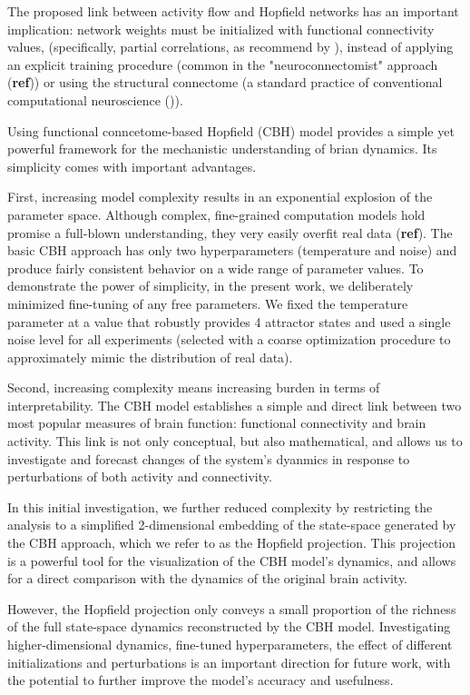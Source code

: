 \documentclass{article}
\begin{document}
The proposed link between activity flow and Hopfield networks has an important implication: network weights must be initialized with functional connectivity values, (specifically, partial correlations, as recommend by \href{https://doi.org/10.1038/nn.4406}{}), instead of applying an explicit training procedure (common in the "neuroconnectomist" approach (\textbf{ref})) or using the structural connectome (a standard practice of conventional computational neuroscience (\href{https://doi.org/10.1016/j.neuroimage.2017.03.045}{})).

Using functional conncetome-based Hopfield (CBH) model provides a simple yet powerful framework for the mechanistic understanding of brian dynamics. Its simplicity comes with important advantages.

First, increasing model complexity results in an exponential explosion of the parameter space. Although complex, fine-grained computation models hold promise a full-blown understanding, they very easily overfit real data (\textbf{ref}). The basic CBH approach has only two hyperparameters (temperature and noise) and produce fairly consistent behavior on a wide range of parameter values. To demonstrate the power of simplicity, in the present work, we deliberately minimized fine-tuning of any free parameters. We fixed the temperature parameter at a value that robustly provides 4 attractor states and used a single noise level for all experiments (selected with a coarse optimization procedure to approximately mimic the distribution of real data).

Second, increasing complexity means increasing burden in terms of interpretability. The CBH model establishes a simple and direct link between two most popular measures of brain function: functional connectivity and brain activity. This link is not only conceptual, but also mathematical, and allows us to investigate and forecast changes of the system's dyanmics in response to perturbations of both activity and connectivity.

In this initial investigation, we further reduced complexity by restricting the analysis to a simplified 2-dimensional embedding of the state-space generated by the CBH approach, which we refer to as the Hopfield projection. This projection is a powerful tool for the visualization of the CBH model's dynamics, and allows for a direct comparison with the dynamics of the original brain activity.

However, the Hopfield projection only conveys a small proportion of the richness of the full state-space dynamics reconstructed by the CBH model.
Investigating higher-dimensional dynamics, fine-tuned hyperparameters, the effect of different initializations and perturbations is an important direction for future work, with the potential to further improve the model's accuracy and usefulness.
\end{document}
